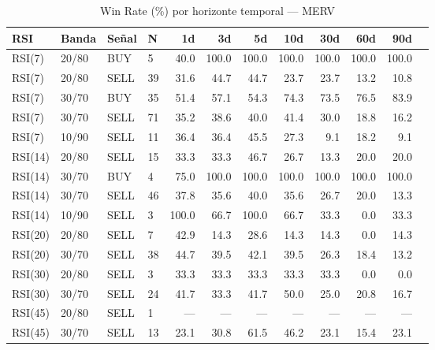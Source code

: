%
\begin{table}[htbp]
    \centering
    \caption{Win Rate (\%) por horizonte temporal --- MERV}
    \label{tab:winrate_merv}
    \small
    \begin{tabular}{llllrrrrrrrr}
        \toprule
        \textbf{RSI} & \textbf{Banda} & \textbf{Se\~{n}al} & \textbf{N} & \textbf{1d} & \textbf{3d} & \textbf{5d} & \textbf{10d} & \textbf{30d} & \textbf{60d} & \textbf{90d} \\
        \midrule
        RSI(7) & 20/80 & BUY & 5 & 40.0 & 100.0 & 100.0 & 100.0 & 100.0 & 100.0 & 100.0 \\
        RSI(7) & 20/80 & SELL & 39 & 31.6 & 44.7 & 44.7 & 23.7 & 23.7 & 13.2 & 10.8 \\
        RSI(7) & 30/70 & BUY & 35 & 51.4 & 57.1 & 54.3 & 74.3 & 73.5 & 76.5 & 83.9 \\
        RSI(7) & 30/70 & SELL & 71 & 35.2 & 38.6 & 40.0 & 41.4 & 30.0 & 18.8 & 16.2 \\
        RSI(7) & 10/90 & SELL & 11 & 36.4 & 36.4 & 45.5 & 27.3 & 9.1 & 18.2 & 9.1 \\
        \midrule
        RSI(14) & 20/80 & SELL & 15 & 33.3 & 33.3 & 46.7 & 26.7 & 13.3 & 20.0 & 20.0 \\
        RSI(14) & 30/70 & BUY & 4 & 75.0 & 100.0 & 100.0 & 100.0 & 100.0 & 100.0 & 100.0 \\
        RSI(14) & 30/70 & SELL & 46 & 37.8 & 35.6 & 40.0 & 35.6 & 26.7 & 20.0 & 13.3 \\
        RSI(14) & 10/90 & SELL & 3 & 100.0 & 66.7 & 100.0 & 66.7 & 33.3 & 0.0 & 33.3 \\
        \midrule
        RSI(20) & 20/80 & SELL & 7 & 42.9 & 14.3 & 28.6 & 14.3 & 14.3 & 0.0 & 14.3 \\
        RSI(20) & 30/70 & SELL & 38 & 44.7 & 39.5 & 42.1 & 39.5 & 26.3 & 18.4 & 13.2 \\
        \midrule
        RSI(30) & 20/80 & SELL & 3 & 33.3 & 33.3 & 33.3 & 33.3 & 33.3 & 0.0 & 0.0 \\
        RSI(30) & 30/70 & SELL & 24 & 41.7 & 33.3 & 41.7 & 50.0 & 25.0 & 20.8 & 16.7 \\
        \midrule
        RSI(45) & 20/80 & SELL & 1 & --- & --- & --- & --- & --- & --- & --- \\
        RSI(45) & 30/70 & SELL & 13 & 23.1 & 30.8 & 61.5 & 46.2 & 23.1 & 15.4 & 23.1 \\
        \bottomrule
    \end{tabular}
\end{table}
